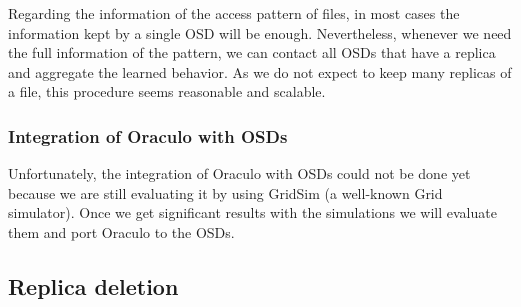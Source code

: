 Regarding the information of the access pattern of files, in most cases the
information kept by a single OSD will be enough. Nevertheless, whenever we need
the full information of the pattern, we can contact all OSDs that have a replica
and aggregate the learned behavior. As we do not expect to keep many replicas of
a file, this procedure seems reasonable and scalable.

\subsubsection{Integration of Oraculo with OSDs}

Unfortunately, the integration of Oraculo with OSDs could not be done yet
because we are still evaluating it by using GridSim (a well-known Grid
simulator). Once we get significant results with the simulations we will
evaluate them and port Oraculo to the OSDs.







\subsection{Replica deletion}
\label{RMS_Replica_Deletion}

